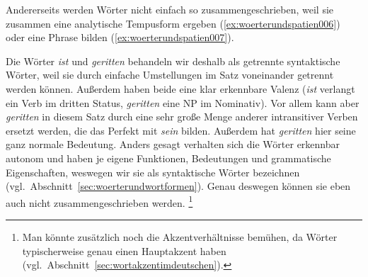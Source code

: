 Andererseits werden Wörter nicht einfach so zusammengeschrieben, \zB weil sie zusammen eine analytische Tempusform ergeben (\ref{ex:woerterundspatien006}) oder eine Phrase bilden (\ref{ex:woerterundspatien007}).


\begin{exe}
  \ex\label{ex:woerterundspatien005}
  \begin{xlist}
  \end{xlist}
\end{exe}

Die Wörter \textit{ist} und \textit{geritten} behandeln wir \zB deshalb als getrennte syntaktische Wörter, weil sie durch einfache Umstellungen im Satz voneinander getrennt werden können.
Außerdem haben beide eine klar erkennbare Valenz (\textit{ist} verlangt ein Verb im dritten Status, \textit{geritten} eine NP im Nominativ).
Vor allem kann aber \textit{geritten} in diesem Satz durch eine sehr große Menge anderer intransitiver Verben ersetzt werden, die das Perfekt mit \textit{sein} bilden.
Außerdem hat \textit{geritten} hier seine ganz normale Bedeutung.
Anders gesagt verhalten sich die Wörter erkennbar autonom und haben je eigene Funktionen, Bedeutungen und grammatische Eigenschaften, weswegen wir sie als syntaktische Wörter bezeichnen (vgl.\ Abschnitt~\ref{sec:woerterundwortformen}).
Genau deswegen können sie eben auch nicht zusammengeschrieben werden.%
\footnote{Man könnte zusätzlich noch die Akzentverhältnisse bemühen, da Wörter typischerweise genau einen Hauptakzent haben (vgl.\ Abschnitt~\ref{sec:wortakzentimdeutschen}).}

